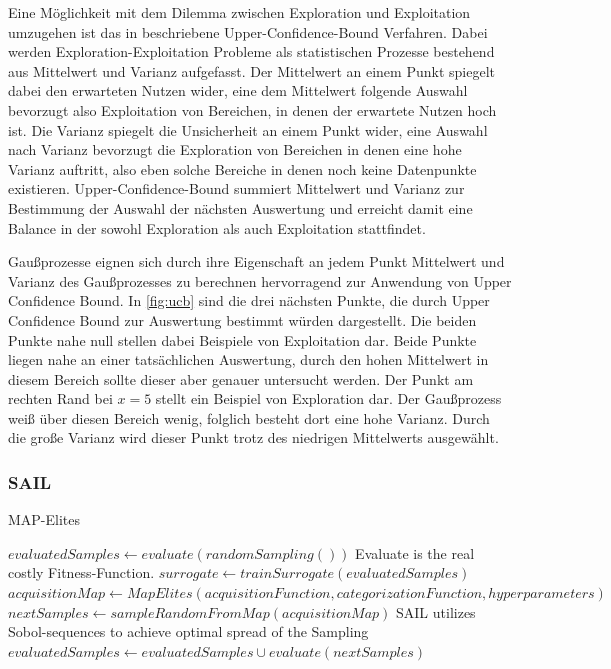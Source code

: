Eine Möglichkeit mit dem Dilemma zwischen Exploration und Exploitation umzugehen ist das in \cite{Auer.2002} beschriebene Upper-Confidence-Bound Verfahren. Dabei werden Exploration-Exploitation Probleme als statistischen Prozesse bestehend aus Mittelwert und Varianz aufgefasst.
Der Mittelwert an einem Punkt spiegelt dabei den erwarteten Nutzen wider, eine dem Mittelwert folgende Auswahl bevorzugt also Exploitation von Bereichen, in denen der erwartete Nutzen hoch ist.
Die Varianz spiegelt die Unsicherheit an einem Punkt wider, eine Auswahl nach Varianz bevorzugt die Exploration von Bereichen in denen eine hohe Varianz auftritt, also eben solche Bereiche in denen noch keine Datenpunkte existieren.
Upper-Confidence-Bound summiert Mittelwert und Varianz zur Bestimmung der Auswahl der nächsten Auswertung und erreicht damit eine Balance in der sowohl Exploration als auch Exploitation stattfindet.

Gaußprozesse eignen sich durch ihre Eigenschaft an jedem Punkt Mittelwert und Varianz des Gaußprozesses zu berechnen hervorragend zur Anwendung von Upper Confidence Bound.
In \cref{fig:ucb} sind die drei nächsten Punkte, die durch Upper Confidence Bound zur Auswertung bestimmt würden dargestellt.
Die beiden Punkte nahe null stellen dabei Beispiele von Exploitation dar. 
Beide Punkte liegen nahe an einer tatsächlichen Auswertung, durch den hohen Mittelwert in diesem Bereich sollte dieser aber genauer untersucht werden.
Der Punkt am rechten Rand bei $x=5$ stellt ein Beispiel von Exploration dar.
Der Gaußprozess weiß über diesen Bereich wenig, folglich besteht dort eine hohe Varianz.
Durch die große Varianz wird dieser Punkt trotz des niedrigen Mittelwerts ausgewählt.

\subsubsection{SAIL}

\begin{algorithm}
	\caption{MAP-Elites} \label{alg:sail}
	\begin{algorithmic}[1]
\State $evaluatedSamples \gets evaluate(randomSampling())$ \Comment Evaluate is the real costly Fitness-Function.
\Else
\State $surrogate \gets trainSurrogate(evaluatedSamples)$
\State $acquisitionMap \gets MapElites(acquisitionFunction,categorizationFunction,hyperparameters)$
\State $nextSamples \gets sampleRandomFromMap(acquisitionMap)$ \Comment SAIL utilizes Sobol-sequences to achieve optimal spread of the Sampling
\State $evaluatedSamples \gets evaluatedSamples \cup evaluate(nextSamples)$
\EndIf
			\EndWhile
		\EndProcedure
	\end{algorithmic}
\end{algorithm}

